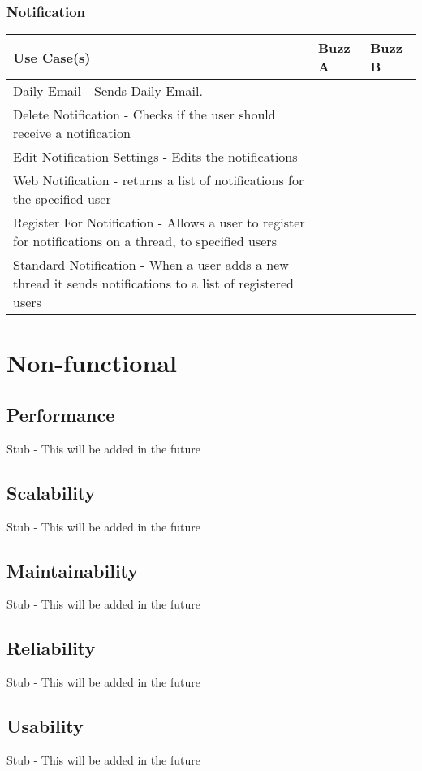 \documentclass[12pt]{article}
\begin{document}
\subsubsection{Notification}%
\begin{tabular}{|p{4.5cm}|p{4.5cm}|p{4.5cm}|}

\hline
Use Case(s) & Buzz A & Buzz B \\ 
\hline
Daily Email - Sends Daily Email. & & \\ %
\hline
Delete Notification - Checks if the user should receive a notification & &\\ %
\hline
Edit Notification Settings - Edits the notifications  & &\\ %
\hline
Web Notification - returns a list of notifications for the specified user & & \\ %
\hline
Register For Notification - Allows a user to register for notifications on a thread, to specified users  & & \\ %
\hline
Standard Notification - When a user adds a new thread it sends notifications to a list of registered users & & \\ %
\hline


\end{tabular}
\section{Non-functional} %
\subsection{Performance}
Stub - This will be added in the future
\subsection{Scalability}
Stub - This will be added in the future
\subsection{Maintainability}
Stub - This will be added in the future
\subsection{Reliability}
Stub - This will be added in the future
\subsection{Usability}
Stub - This will be added in the future
\end{document}
